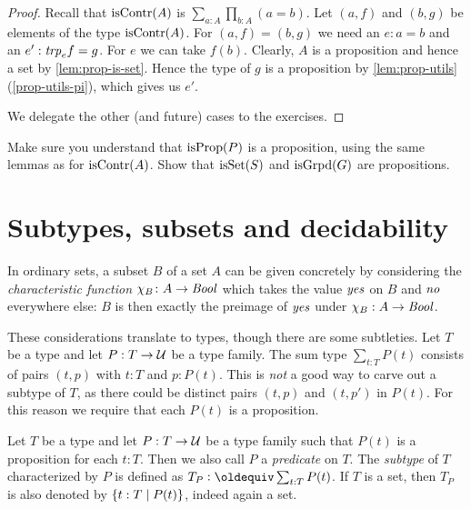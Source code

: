 \begin{proof}
Recall that $\mathrm{isContr}(A)$ is $\sum_{a:A} \prod_{b:A} (a=b)$.
Let $(a,f)$ and $(b,g)$ be elements of the type $\mathrm{isContr}(A)$.
For $(a,f) = (b,g)$ we need an $e : a=b$ and an $e' : \mathord{\mathit{trp}}_e f = g$.
For $e$ we can take $f(b)$. Clearly, $A$ is a proposition and hence
a set by \cref{lem:prop-is-set}. Hence the type of $g$ is a proposition
by \cref{lem:prop-utils}(\ref{prop-utils-pi}), which gives us $e'$.

We delegate the other (and future) cases to the exercises.
\end{proof}

\begin{xca}\label{xca:isX-is-prop}
Make sure you understand that $\mathrm{isProp}(P)$ is a proposition,
using the same lemmas as for $\mathrm{isContr}(A)$.
Show that $\mathrm{isSet}(S)$ and $\mathrm{isGrpd}(G)$ are propositions.
\end{xca}

\section{Subtypes, subsets and decidability}
\label{sec:subtype}

In ordinary sets, a subset $B$ of a set $A$ can be given concretely by 
considering the \emph{characteristic function} $\chi_B\colon A\to\mathop{\mathit{Bool}}$ 
which takes the value $\mathop{\mathit{yes}}$ on $B$ and $\mathop{\mathit{no}}$ everywhere else: 
$B$ is then exactly the preimage of $\mathop{\mathit{yes}}$ under $\chi_B: A\to\mathop{\mathit{Bool}}$.

These considerations translate to types, though there are some 
subtleties. Let $T$ be a type and let $P: T\to\mathcal{U}$ be a type family.
The sum type $\sum_{t:T} P(t)$ consists of pairs $(t,p)$ with
$t:T$ and $p:P(t)$. This is \emph{not} a good way to carve out a subtype
of $T$, as there could be distinct pairs $(t,p)$ and $(t,p')$ in $P(t)$.
For this reason we require that each $P(t)$ is a proposition.

\begin{definition}\label{def:subtype}
Let $T$ be a type and let $P: T\to\mathcal{U}$ be a type family such that
$P(t)$ is a proposition for each $t:T$. Then we also
call $P$ a \emph{predicate} on $T$.
The \emph{subtype} of $T$ characterized by $P$ is defined 
as $T_P\defeq \sum_{t:T} P(t)$.
If $T$ is a set, then $T_P$
is also denoted by $\{t:T \mid P(t)\}$, indeed again a set.
\end{definition}

